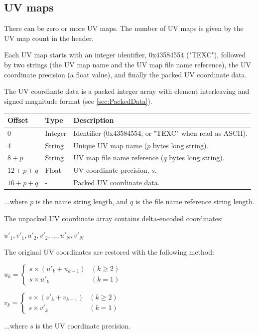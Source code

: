 \subsection{UV maps}
There can be zero or more UV maps. The number of UV maps is given by the
UV map count in the header.

Each UV map starts with an integer identifier, 0x43584554 ("TEXC"), followed
by two strings (the UV map name and the UV map file name reference), the
UV coordinate precision (a float value), and finally the packed UV coordinate data.

The UV coordinate data is a packed integer array with element interleaving
and signed magnitude format (see \ref{sec:PackedData}).

\begin{tabular}{|l|l|l|}\hline
\textbf{Offset} &  \textbf{Type} & \textbf{Description}\\ \hline
0 & Integer & Identifier (0x43584554, or "TEXC" when read as ASCII).\\ \hline
4 & String & Unique UV map name ($p$ bytes long string).\\ \hline
$8+p$ & String & UV map file name reference ($q$ bytes long string).\\ \hline
$12+p+q$ & Float & UV coordinate precision, $s$.\\ \hline
$16+p+q$ & - & Packed UV coordinate data.\\ \hline
\end{tabular}

...where $p$ is the name string length, and $q$ is the file name reference string
length.

The unpacked UV coordinate array contains delta-encoded coordinates:

$u'_1, v'_1, u'_2, v'_2, ..., u'_N, v'_N$

The original UV coordinates are restored with the following method:

$u_k = \begin{cases}
s \times (u'_k + u_{k-1}) & (k \geq 2)\\
s \times u'_k & (k = 1)
\end{cases}$

$v_k = \begin{cases}
s \times (v'_k + v_{k-1}) & (k \geq 2)\\
s \times v'_k & (k = 1)
\end{cases}$

...where $s$ is the UV coordinate precision.

